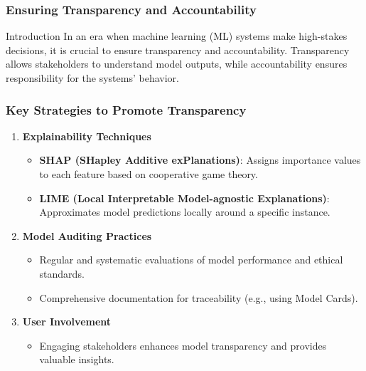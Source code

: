 \documentclass[aspectratio=169]{beamer}
\begin{document}
\begin{frame}[fragile]
    \frametitle{Ensuring Transparency and Accountability}
    \begin{block}{Introduction}
        In an era when machine learning (ML) systems make high-stakes decisions, it is crucial to ensure transparency and accountability. 
        Transparency allows stakeholders to understand model outputs, while accountability ensures responsibility for the systems' behavior.
    \end{block}
\end{frame}

\begin{frame}[fragile]
    \frametitle{Key Strategies to Promote Transparency}
    \begin{enumerate}
        \item \textbf{Explainability Techniques}
        \begin{itemize}
            \item \textbf{SHAP (SHapley Additive exPlanations)}: Assigns importance values to each feature based on cooperative game theory.
            \item \textbf{LIME (Local Interpretable Model-agnostic Explanations)}: Approximates model predictions locally around a specific instance.
        \end{itemize}

        \item \textbf{Model Auditing Practices}
        \begin{itemize}
            \item Regular and systematic evaluations of model performance and ethical standards.
            \item Comprehensive documentation for traceability (e.g., using Model Cards).
        \end{itemize}

        \item \textbf{User Involvement}
        \begin{itemize}
            \item Engaging stakeholders enhances model transparency and provides valuable insights.
        \end{itemize}
    \end{enumerate}
\end{frame}
\end{document}
